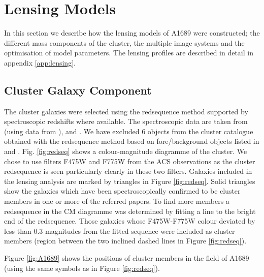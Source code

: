 \documentclass[useAMS,usenatbib]{mn2e}
\newcounter{one}   \setcounter{one}{1}
\newcounter{two}   \setcounter{two}{2}
\begin{document}
\section{Lensing Models}
\label{sec:models}

In this section we describe how the lensing models of A1689 were
constructed; the different mass components of the cluster, the
multiple image systems and the optimisation of model parameters. The
lensing profiles are described in detail in appendix
\ref{app:lensing}.


\subsection{Cluster Galaxy Component}
\label{sec:galaxies}

The cluster galaxies were selected using the redsequence method
supported by spectroscopic redshifts where available. The
spectroscopic data are taken from \citet{girardi:97} (using data from
\citet{teague:90}), \citet{balogh:02} and \citet{duc:02}. We have
excluded 6 objects from the cluster catalogue obtained with the
redsequence method based on fore/background objects listed in
\citet{balogh:02} and \citet{duc:02}. Fig. \ref{fig:redseq} shows a
colour-magnitude diagramme of the cluster. We chose to use filters
F475W and F775W from the ACS observations as the cluster redsequence
is seen particularly clearly in these two filters. Galaxies included
in the lensing analysis are marked by triangles in Figure
\ref{fig:redseq}. Solid triangles show the galaxies which have been
spectroscopically confirmed to be cluster members in one or more of
the referred papers. To find more members a redsequence in the CM
diagramme was determined by fitting a line to the bright end of the
redsequence. Those galaxies whose F475W-F775W colour deviated by less
than 0.3 magnitudes from the fitted sequence were included as cluster
members (region between the two inclined dashed lines in Figure
\ref{fig:redseq}).

Figure \ref{fig:A1689} shows the positions of cluster members in the
field of A1689 (using the same symbols as in Figure
\ref{fig:redseq}).\\
\end{document}
